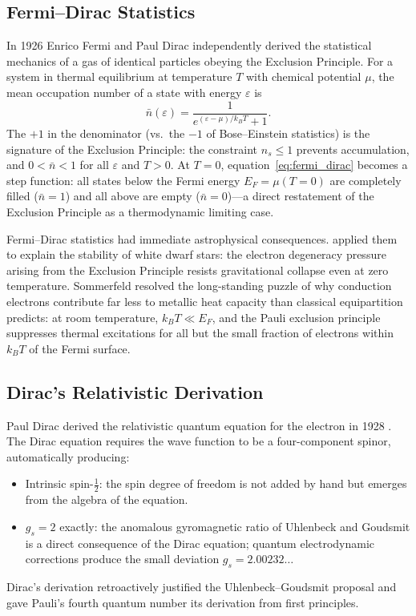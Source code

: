 \documentclass[12pt]{article}
\begin{document}
\subsection{Fermi--Dirac Statistics}

In 1926 Enrico Fermi \citeyearpar{Fermi1926} and Paul Dirac
\citeyearpar{Dirac1926} independently derived the statistical mechanics of
a gas of identical particles obeying the Exclusion Principle.  For a system
in thermal equilibrium at temperature $T$ with chemical potential $\mu$, the
mean occupation number of a state with energy $\varepsilon$ is
\begin{equation}\label{eq:fermi_dirac}
  \bar{n}(\varepsilon) = \frac{1}{e^{(\varepsilon-\mu)/k_BT} + 1}.
\end{equation}
The $+1$ in the denominator (vs.\ the $-1$ of Bose--Einstein statistics)
is the signature of the Exclusion Principle: the constraint $n_s\leq 1$
prevents accumulation, and $0 < \bar{n} < 1$ for all $\varepsilon$ and $T>0$.
At $T=0$, equation~\eqref{eq:fermi_dirac} becomes a step function: all states
below the Fermi energy $E_F = \mu(T=0)$ are completely filled
($\bar{n}=1$) and all above are empty ($\bar{n}=0$)---a direct restatement
of the Exclusion Principle as a thermodynamic limiting case.

Fermi--Dirac statistics had immediate astrophysical consequences.
\citet{Fowler1926} applied them to explain the stability of white dwarf
stars: the electron degeneracy pressure arising from the Exclusion Principle
resists gravitational collapse even at zero temperature.  Sommerfeld
\citeyearpar{Sommerfeld1927} resolved the long-standing puzzle of why
conduction electrons contribute far less to metallic heat capacity than
classical equipartition predicts: at room temperature, $k_BT \ll E_F$,
and the Pauli exclusion principle suppresses thermal excitations for all
but the small fraction of electrons within $k_BT$ of the Fermi surface.

\subsection{Dirac's Relativistic Derivation}

Paul Dirac derived the relativistic quantum equation for the electron in 1928
\citep{Dirac1928}.  The Dirac equation requires the wave function to be a
four-component spinor, automatically producing:
\begin{itemize}
  \item Intrinsic spin-$\tfrac{1}{2}$: the spin degree of freedom is not
    added by hand but emerges from the algebra of the equation.
  \item $g_s = 2$ exactly: the anomalous gyromagnetic ratio of Uhlenbeck and
    Goudsmit is a direct consequence of the Dirac equation; quantum
    electrodynamic corrections produce the small deviation
    $g_s = 2.00232\ldots$
\end{itemize}
Dirac's derivation retroactively justified the Uhlenbeck--Goudsmit proposal
and gave Pauli's fourth quantum number its derivation from first principles.
\end{document}
